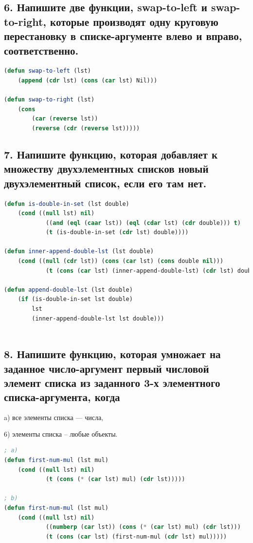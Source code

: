 \documentclass[12pt]{report}
\begin{document}
\subsection*{6. Напишите две функции, swap-to-left и swap-to-right, которые производят одну круговую
	перестановку в списке-аргументе влево и вправо, соответственно.}

\begin{lstlisting}[label=6xd, caption=Решение задания №6, language=lisp]
(defun swap-to-left (lst) 
	(append (cdr lst) (cons (car lst) Nil)))

(defun swap-to-right (lst)
	(cons
		(car (reverse lst))
		(reverse (cdr (reverse lst)))))

\end{lstlisting}

\subsection*{7. Напишите функцию, которая добавляет к множеству двухэлементных списков новый
	двухэлементный список, если его там нет.}

\begin{lstlisting}[label=6xd, caption=Решение задания №7, language=lisp]	
(defun is-double-in-set (lst double) 
	(cond ((null lst) nil) 
			((and (eql (caar lst)) (eql (cdar lst) (cdr double))) t)
			(t (is-double-in-set (cdr lst) double))))
			
(defun inner-append-double-lst (lst double)
	(cond ((null (cdr lst)) (cons (car lst) (cons double nil)))
			(t (cons (car lst) (inner-append-double-lst) (cdr lst) double))))
			
(defun append-double-lst (lst double)
	(if (is-double-in-set lst double)
		lst
		(inner-append-double-lst lst double)))
	
\end{lstlisting}

\subsection*{8. Напишите функцию, которая умножает на заданное число-аргумент первый числовой
	элемент списка из заданного 3-х элементного списка-аргумента, когда}

a) все элементы списка --- числа,

6) элементы списка -- любые объекты.

\begin{lstlisting}[label=6xd, caption=Решение задания №8, language=lisp]
; a)
(defun first-num-mul (lst mul) 
	(cond ((null lst) nil)
			(t (cons (* (car lst) mul) (cdr lst)))))
			
; b)
(defun first-num-mul (lst mul)
	(cond ((null lst) nil)
			((numberp (car lst)) (cons (* (car lst) mul) (cdr lst)))
			(t (cons (car lst) (first-num-mul (cdr lst) mul)))))

\end{lstlisting}
\end{document}
